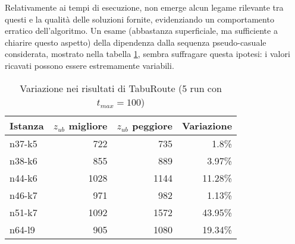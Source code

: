 \documentclass[11pt,oneside,a4paper]{article}
\begin{document}
Relativamente ai tempi di esecuzione, non emerge alcun legame rilevante tra questi e la qualità delle
soluzioni fornite, evidenziando un comportamento erratico dell'algoritmo. Un esame (abbastanza superficiale,
ma sufficiente a chiarire questo aspetto) della dipendenza dalla sequenza pseudo-casuale considerata, mostrato
nella tabella \ref{t_var:meta}, sembra suffragare questa ipotesi: i valori ricavati possono essere
estremamente variabili.

\begin{table}[h]
\centering
\begin{tabular}{|p{1.8cm}|r|r|r|}

\hline
Istanza &
\multicolumn{1}{c|}{$z_{ub}$ migliore} &
\multicolumn{1}{c|}{$z_{ub}$ peggiore} &
\multicolumn{1}{c|}{Variazione} \\
\hline
n37-k5 &722& 735  & 1.8\% \\
n38-k6 &855& 889& 3.97\% \\
n44-k6 &1028&1144& 11.28\% \\
n46-k7 &971& 982 & 1.13\% \\
n51-k7 &1092& 1572 & 43.95\% \\
n64-l9 &905&1080 & 19.34\% \\
\hline

\end{tabular}
\caption{Variazione nei risultati di TabuRoute (5 run con $t_{max}=100$)}\label{t_var:meta}
\end{table}
\end{document}

